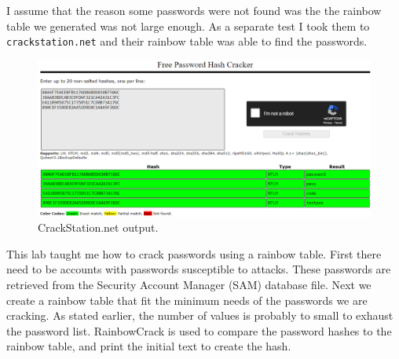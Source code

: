 I assume that the reason some passwords were not found was the the rainbow table we generated was not large enough.
As a separate test I took them to \verb|crackstation.net| and their rainbow table was able to find the passwords.
\begin{figure}[H]
    \centering
    \includegraphics[width=\linewidth]{figures/7-crack-hash.png}
    \caption{CrackStation.net output.}
\end{figure}

This lab taught me how to crack passwords using a rainbow table.
First there need to be accounts with passwords susceptible to attacks.
These passwords are retrieved from the Security Account Manager (SAM) database file.
Next we create a rainbow table that fit the minimum needs of the passwords we are cracking.
As stated earlier, the number of values is probably to small to exhaust the password list.
RainbowCrack is used to compare the password hashes to the rainbow table, and print the initial text to create the hash.